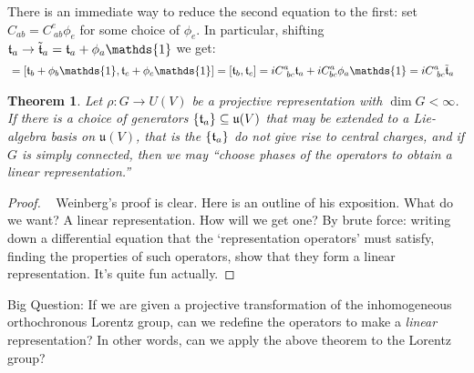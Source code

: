 \documentclass[10pt]{article}
\newcommand{\iden}{\mathds{1}}
\newcommand{\mf}{\mathfrak}
\theoremstyle{plain}
\newtheorem{theorem}{Theorem}[section]
\theoremstyle{definition}
\theoremstyle{remark}
\def\seq{\subseteq}
\begin{document}
There is an immediate way to reduce the second equation to the first:
set $C_{ab} = C^{e}_{\ ab}\phi_e$ for some choice of $\phi_e$. In
particular, shifting $\mt_a\to\tilde\mt_a = \mt_a + \phi_a\iden$ we get:
\begin{align*}
    [\tilde\mt_a,\tilde\mt_b]
&= [\mt_b + \phi_b\iden,\mt_c+\phi_c\iden] = [\mt_b,\mt_c]
= iC^{a}_{\ bc}\mt_a + iC^{a}_{bc}\phi_a\iden
= iC^{a}_{\ bc}\tilde\mt_a
\end{align*}

\begin{theorem}
    Let $\rho:G\to U(V)$ be a projective representation with $\dim G <
    \infty$. If there is a choice of generators $\{\mt_a\}\seq \mf
    u(V)$ that may be extended to a Lie-algebra basis on $\mf u(V)$,
    that is the $\{\mt_a\}$ do not give rise to central charges, and
    if $G$ is simply connected, then we may ``choose phases of the
    operators to obtain a linear representation.''
\end{theorem}

\renewcommand{\th}{\theta}
\begin{proof}{\ }
    Weinberg's proof is clear. Here is an outline of his exposition.
    What do we want? A linear representation. How will we get one? By
    brute force: writing down a differential equation that the
    `representation operators' must satisfy, finding the properties of
    such operators, show that they form a linear representation. It's
    quite fun actually.
    \begin{comment}
    \begin{itemize}
        \item Recall: construction of $\rho(T)$
    \begin{itemize}
        \item Choose $\theta$,$f$ so that $T(\th)T(\th')= T(f(\th,\th'))$
        \item 
    \end{itemize}
    \end{itemize}
    \end{comment}
\end{proof}

\begin{mdframed}
    Big Question: If we are given a projective transformation of the
    inhomogeneous orthochronous Lorentz group, can we redefine the
    operators to make a \emph{linear} representation?  In other words,
    can we apply the above theorem to the Lorentz group?
\end{mdframed}
\end{document}
